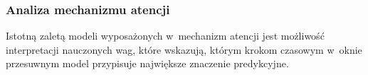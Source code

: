 


\subsubsection{Analiza mechanizmu atencji}

Istotną zaletą modeli wyposażonych w~mechanizm atencji jest możliwość interpretacji nauczonych wag, które wskazują, którym krokom czasowym w~oknie przesuwnym model przypisuje największe znaczenie predykcyjne.



